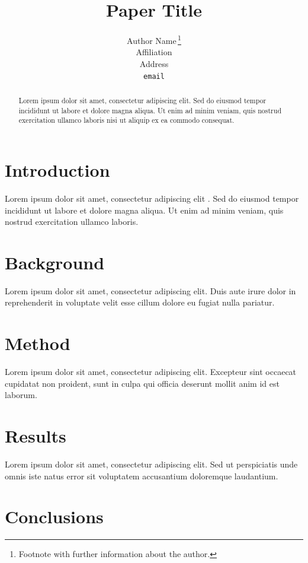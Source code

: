 \documentclass{article}
\title{Paper Title}
\author{%
  Author Name\,\orcidlink{0000-0000-0000-0000}\thanks{Footnote with further information about the author.} \\
  Affiliation \\
  Address \\
  \texttt{email} \\
}
\begin{document}
\maketitle


\begin{abstract}
  Lorem ipsum dolor sit amet, consectetur adipiscing elit. Sed do eiusmod tempor incididunt ut labore et dolore magna aliqua. Ut enim ad minim veniam, quis nostrud exercitation ullamco laboris nisi ut aliquip ex ea commodo consequat.
\end{abstract}


\section{Introduction}
\label{sec:introduction}

Lorem ipsum dolor sit amet, consectetur adipiscing elit \citep{placeholder}. Sed do eiusmod tempor incididunt ut labore et dolore magna aliqua. Ut enim ad minim veniam, quis nostrud exercitation ullamco laboris.


\section{Background}
\label{sec:background}

Lorem ipsum dolor sit amet, consectetur adipiscing elit. Duis aute irure dolor in reprehenderit in voluptate velit esse cillum dolore eu fugiat nulla pariatur.


\section{Method}
\label{sec:method}

Lorem ipsum dolor sit amet, consectetur adipiscing elit. Excepteur sint occaecat cupidatat non proident, sunt in culpa qui officia deserunt mollit anim id est laborum.


\section{Results}
\label{sec:results}

Lorem ipsum dolor sit amet, consectetur adipiscing elit. Sed ut perspiciatis unde omnis iste natus error sit voluptatem accusantium doloremque laudantium.


\section{Conclusions}
\label{sec:conclusions}
\end{document}
